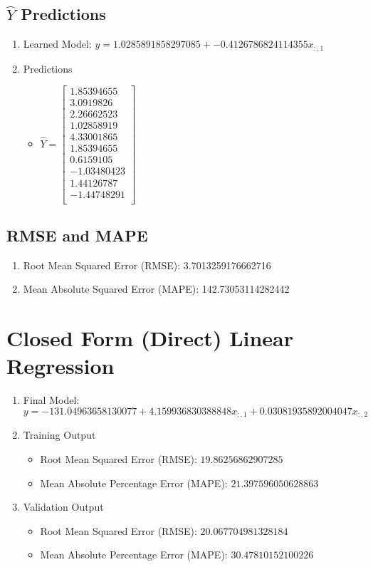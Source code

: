 \documentclass[12pt]{article}
\begin{document}
\subsection{$\hat{Y}$ Predictions}
\begin{enumerate}
   \item Learned Model: $y=1.0285891858297085 + -0.4126786824114355x_{:,1}$
   \item Predictions
   \begin{itemize}
    \item $\hat{Y} = 
        \begin{bmatrix}
        	1.85394655\\
        	3.0919826\\	
        	2.26662523\\
        	1.02858919\\
        	4.33001865\\
        	1.85394655\\
        	0.6159105\\
        	-1.03480423\\
        	1.44126787\\
        	-1.44748291\\
        \end{bmatrix}$
   \end{itemize}
\end{enumerate}

\subsection{RMSE and MAPE}

\begin{enumerate}
   \item Root Mean Squared Error (RMSE): 3.7013259176662716
   \item Mean Absolute Squared Error (MAPE): 142.73053114282442
\end{enumerate}

\newpage
\section{Closed Form (Direct) Linear Regression}

\begin{enumerate}
   \item Final Model: $y=-131.04963658130077 + 4.159936830388848x_{:,1} + 0.03081935892004047x_{:,2}$
   \item Training Output
   \begin{itemize}
     \item Root Mean Squared Error (RMSE): $19.86256862907285$
     \item Mean Absolute Percentage Error (MAPE): $21.397596050628863$
   \end{itemize}
   \item Validation Output
   \begin{itemize}
    \item Root Mean Squared Error (RMSE): $20.067704981328184$
    \item Mean Absolute Percentage Error (MAPE): $30.47810152100226$
   \end{itemize}
\end{enumerate}
\end{document}
